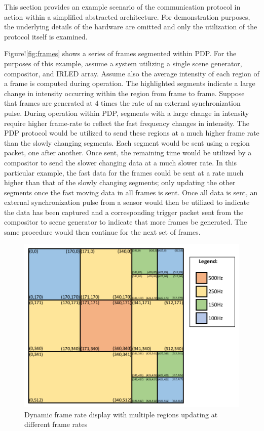 This section provides an example scenario of the communication protocol in action within a simplified abstracted architecture. For demonstration purposes, the underlying details of the hardware are omitted and only the utilization of the protocol itself is examined.

Figure!\ref{fig:frames} shows a series of frames segmented within PDP. For the purposes of this example, assume a system utilizing a single scene generator, compositor, and IRLED array. Assume also the average intensity of each region of a frame is computed during operation. The highlighted segments indicate a large change in intensity occurring within the region from frame to frame. Suppose that frames are generated at 4 times the rate of an external synchronization pulse. During operation within PDP, segments with a large change in intensity require higher frame-rate to reflect the fast frequency changes in intensity. The PDP protocol would be utilized to send these regions at a much higher frame rate than the slowly changing segments. Each segment would be sent using a region packet, one after another. Once sent, the remaining time would be utilized by a compositor to send the slower changing data at a much slower rate. In this particular example, the fast data for the frames could be sent at a rate much higher than that of the slowly changing segments; only updating the other segments once the fast moving data in all frames is sent. Once all data is sent, an external synchronization pulse from a sensor would then be utilized to indicate the data has been captured and a corresponding trigger packet sent from the compositor to scene generator to indicate that more frames be generated. The same procedure would then continue for the next set of frames.

\begin{figure}
    \centering
        \centering
        \includegraphics[width=1.0\textwidth]{fig/variable_display.pdf}
        \caption{Dynamic frame rate display with multiple regions updating at different frame rates}
        \label{fig:variable_display}
\end{figure}


